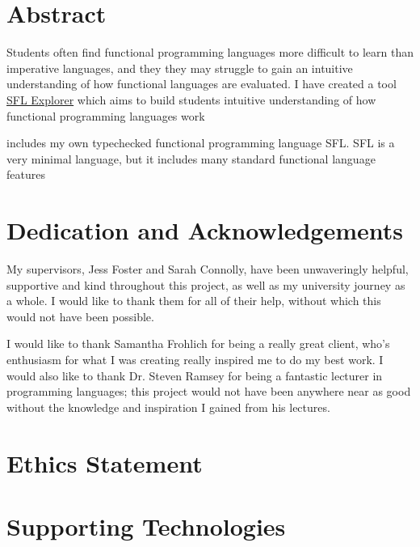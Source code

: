 \chapter*{Abstract}
Students often find functional programming languages more difficult to learn than imperative languages, and they they may struggle to gain an intuitive understanding of how functional languages are evaluated. I have created a tool \href{https://functional.kiransturt.co.uk}{SFL Explorer} which aims to build students intuitive understanding of how functional programming languages work

includes my own typechecked functional programming language SFL. SFL is a very minimal language, but it includes many standard functional language features



\chapter*{Dedication and Acknowledgements}
My supervisors, Jess Foster and Sarah Connolly, have been unwaveringly helpful, supportive and kind throughout this project, as well as my university journey as a whole. I would like to thank them for all of their help, without which this would not have been possible. 

I would like to thank Samantha Frohlich for being a really great client, who's enthusiasm for what I was creating really inspired me to do my best work. I would also like to thank Dr. Steven Ramsey for being a fantastic lecturer in programming languages; this project would not have been anywhere near as good without the knowledge and inspiration I gained from his lectures. 

\makedecl
\makeaidecl
\tableofcontents
\listoffigures
\listoftables


\chapter*{Ethics Statement}


\chapter*{Supporting Technologies}
\label{chap:supporting_tech}

